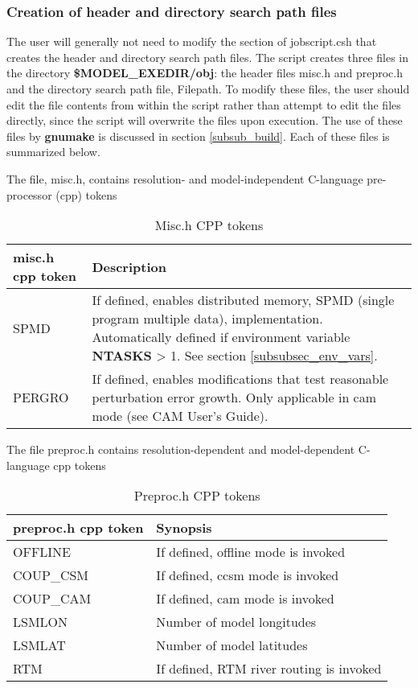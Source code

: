 \subsubsection {Creation of header and directory search path files}
\label{subsubsec_cpp}

The user will generally not need to modify the section of
jobscript.csh that creates the header and directory search path files.
The script creates three files in the directory {\bf
\$MODEL\_EXEDIR/obj}: the header files misc.h and preproc.h and the
directory search path file, Filepath. To modify these files, the user
should edit the file contents from within the script rather than
attempt to edit the files directly, since the script will overwrite
the files upon execution. The use of these files by {\bf gnumake}
is discussed in section \ref{subsub_build}. Each of these files is
summarized below.

The file, misc.h, contains resolution- and model-independent
C-language pre-processor (cpp) tokens

\medskip
\begin{longtable}{|p{1.5in}|p{4.5in}|}
\caption{\label{misc.h} Misc.h CPP tokens} \\
\hline
\endhead
\hline
{\bf misc.h cpp token} & {\bf Description}  \\ \hline
SPMD        & If defined, enables distributed memory, SPMD (single program multiple data), implementation. 
              Automatically defined if environment variable {\bf NTASKS} > 1. See section
	      \ref{subsubsec_env_vars}.   \\ \hline
PERGRO      & If defined, enables modifications that test reasonable perturbation error growth. 
              Only applicable in cam mode (see CAM User's Guide). \\ \hline
\end{longtable}
\medskip

The file preproc.h contains resolution-dependent and model-dependent
C-language cpp tokens

\medskip
\begin{longtable}{|p{1.5in}|p{4.5in}|}
\caption{\label{preproc.h} Preproc.h CPP tokens} \\
\hline
\endhead
\hline
{\bf preproc.h cpp token}  & {\bf Synopsis}  \\ \hline
 OFFLINE        &  If defined, offline mode is invoked \\ \hline
 COUP\_CSM      &  If defined, ccsm mode is invoked \\ \hline
 COUP\_CAM      &  If defined, cam mode is invoked \\ \hline
 LSMLON         &  Number of model longitudes  \\ \hline
 LSMLAT         &  Number of model latitudes \\ \hline
 RTM            &  If defined, RTM river routing is invoked \\ \hline
\end{longtable}
\medskip

